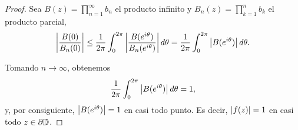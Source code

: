 \begin{proof}

    Sea $B(z) = \prod_{n=1}^{\infty} b_n$ el producto infinito y $B_n(z) = \prod_{k=1}^{n} b_k$ el producto parcial,
    \begin{equation*}
        \left\lvert\frac{B(0)}{B_n(0)}\right\rvert \leq \frac{1}{2 \pi} \int_{0}^{2 \pi} \left\lvert\frac{B(e^{i \theta})}{B_n(e^{i \theta})}\right\rvert d \theta = \frac{1}{2 \pi}  \int_{0}^{2 \pi} \left\lvert B(e^{i \theta})\right\rvert d \theta.
    \end{equation*}

    Tomando $n \to \infty$, obtenemos
    \begin{equation*}
         \frac{1}{2 \pi}  \int_{0}^{2 \pi} \left\lvert B(e^{i \theta})\right\rvert d \theta = 1,
    \end{equation*}
    y, por consiguiente, $\left\lvert B(e^{i \theta})\right\rvert = 1$ en casi todo punto. Es decir, $\left\lvert f(z)\right\rvert = 1$ en casi todo $z \in \partial \mathbb{D}$.
\end{proof}

